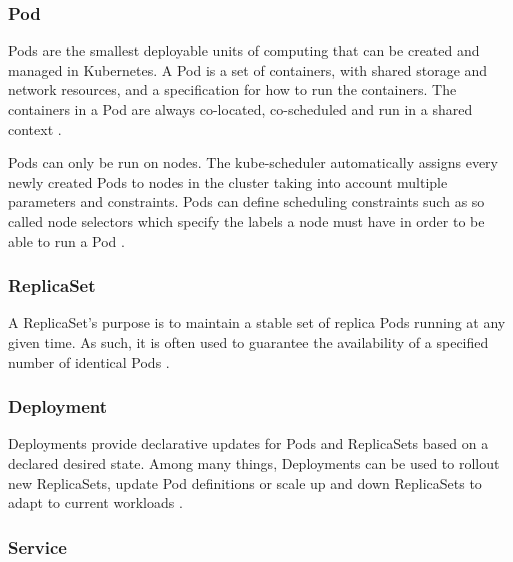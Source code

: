 \subsubsection{Pod} \label{k8s-pod}

Pods are the smallest deployable units of computing that can be created and managed in Kubernetes. A Pod is a set of containers, with shared storage and network resources, and a specification for how to run the containers. The containers in a Pod are always co-located, co-scheduled and run in a shared context \cite{KubernetesPod}.

Pods can only be run on nodes. The kube-scheduler automatically assigns every newly created Pods to nodes in the cluster taking into account multiple parameters and constraints. Pods can define scheduling constraints such as so called node selectors which specify the labels a node must have in order to be able to run a Pod \cite{KubernetesNodeSelector}.

\subsubsection{ReplicaSet}

A ReplicaSet's purpose is to maintain a stable set of replica Pods running at any given time. As such, it is often used to guarantee the availability of a specified number of identical Pods \cite{KubernetesReplicaSet}.

\subsubsection{Deployment}

Deployments provide declarative updates for Pods and ReplicaSets based on a declared desired state. Among many things, Deployments can be used to rollout new ReplicaSets, update Pod definitions or scale up and down ReplicaSets to adapt to current workloads \cite{KubernetesDeployment}.

\subsubsection{Service} \label{k8s-service}

